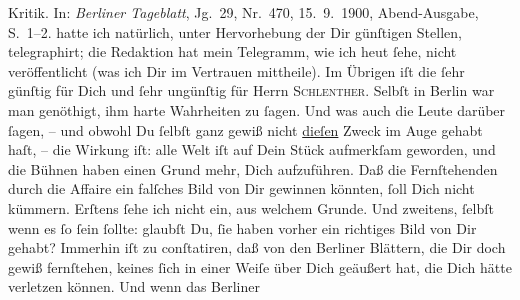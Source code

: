 \begin{ledgroupsized}[t]{13cm}
{{{{                        Kritik}. In: \emph{Berliner Tageblatt},
                     Jg. 29, Nr. 470, 15. 9. 1900, Abend-Ausgabe,
                     S. 1–2.}}}\label{K_L02931-11h} hatte ich natürlich, unter Hervorhebung der Dir günſtigen
               Stellen, telegraphirt; die Redaktion hat mein Telegramm, wie ich heut
               ſehe, nicht veröffentlicht (was ich Dir im Vertrauen mittheile).\pend
           \pstart
           Im Übrigen iſt die \label{K_L02931-2v}\label{K_L02931-2h} ſehr günſtig für Dich und ſehr ungünſtig für Herrn \textsc{Schlenther}. Selbſt in Berlin war man genöthigt, ihm
               harte Wahrheiten zu ſagen. Und was auch die Leute darüber ſagen, – und obwohl Du
               ſelbſt {\pb}ganz gewiß nicht \uline{dieſen} Zweck im Auge gehabt haſt, – die Wirkung iſt:  alle Welt iſt auf Dein Stück aufmerkſam geworden, und die Bühnen
               haben einen Grund mehr, Dich aufzuführen. Daß die Fernſtehenden durch die Affaire ein
               falſches Bild von  Dir gewinnen könnten, ſoll Dich
               nicht kümmern. Erſtens ſehe ich nicht ein, aus welchem Grunde. Und zweitens, ſelbſt
               wenn es ſo ſein ſollte: glaubſt Du, ſie haben vorher ein richtiges Bild von Dir
               gehabt? {\pb}Immerhin iſt zu conſtatiren, daß von den
                  Berliner Blättern, die Dir doch gewiß
               fernſtehen, keines ſich in einer Weiſe über Dich geäußert hat, die Dich hätte
               verletzen können. Und wenn das Berliner

\end{ledgroupsized}
